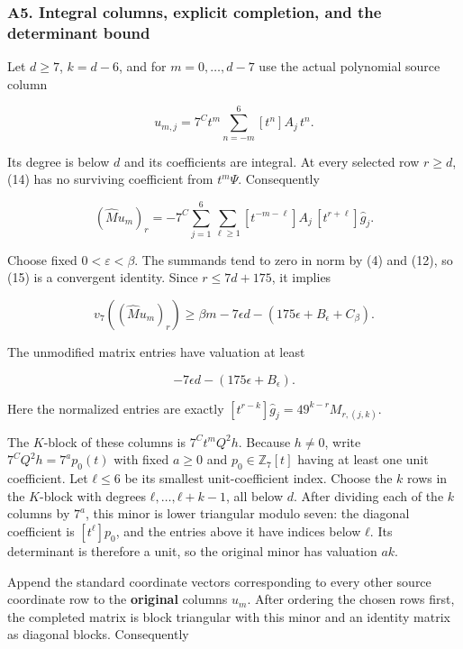 \documentclass[11pt,a4paper]{article}
\begin{document}
\hypertarget{a5.-integral-columns-explicit-completion-and-the-determinant-bound}{%
\subsubsection{A5. Integral columns, explicit completion, and the determinant bound}\label{a5.-integral-columns-explicit-completion-and-the-determinant-bound}}

Let \(d≥7\), \(k=d-6\), and for \(m=0,\ldots ,d-7\) use the actual polynomial source column

\[
u_{m,j}=7^C t^m\sum_{n=-m}^{6}[t^n]A_j\,t^n.
\]

Its degree is below \(d\) and its coefficients are integral. At every selected row \(r≥d\), (14) has no surviving coefficient from \(t^mΨ\). Consequently

\[
(\widehat M u_m)_r
=-7^C\sum_{j=1}^6\sum_{\ell\ge1}
[t^{-m-\ell}]A_j\,[t^{r+\ell}]\widehat g_j.\tag{15}
\]

Choose fixed \(0<ε<β\). The summands tend to zero in norm by (4) and (12), so (15) is a convergent identity. Since \(r≤7d+175\), it implies

\[
v_7((\widehat M u_m)_r)
\ge\beta m-7\epsilon d-(175\epsilon+B_\epsilon+C_\beta).\tag{16}
\]

The unmodified matrix entries have valuation at least

\[
-7\epsilon d-(175\epsilon+B_\epsilon).\tag{17}
\]

Here the normalized entries are exactly \([t^{r-k}]\widehat{g}_j=49^{k-r}M_{r,(j,k)}\).

The \(K\)-block of these columns is \(7^C t^mQ^{2}h\). Because \(h≠0\), write \(7^CQ^{2}h=7^a p_{0}(t)\) with fixed \(a≥0\) and \(p_{0}∈\mathbb{Z}_{7}[t]\) having at least one unit coefficient. Let \(ℓ≤6\) be its smallest unit-coefficient index. Choose the \(k\) rows in the \(K\)-block with degrees \(ℓ,\ldots ,ℓ+k-1\), all below \(d\). After dividing each of the \(k\) columns by \(7^a\), this minor is lower triangular modulo seven: the diagonal coefficient is \([t^ℓ]p_{0}\), and the entries above it have indices below \(ℓ\). Its determinant is therefore a unit, so the original minor has valuation \(ak\).

Append the standard coordinate vectors corresponding to every other source coordinate row to the \textbf{original} columns \(u_m\). After ordering the chosen rows first, the completed matrix is block triangular with this minor and an identity matrix as diagonal blocks. Consequently
\end{document}

